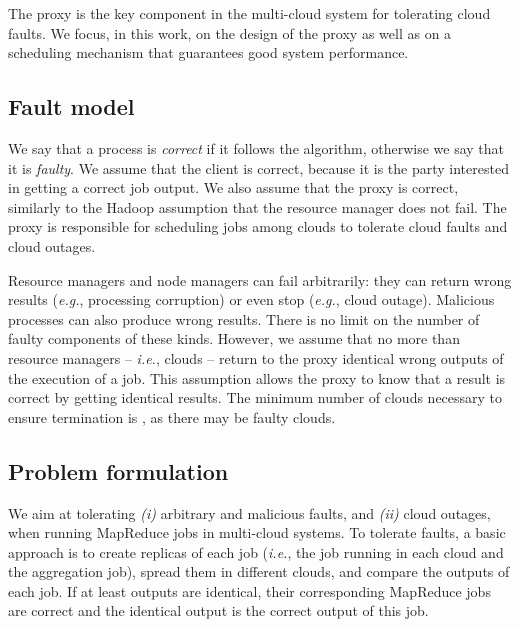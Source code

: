 \documentclass[10pt, conference, compsocconf]{IEEEtran}
\begin{document}
The proxy is the key component in the multi-cloud system for tolerating cloud faults. We focus, in this work, on the design of the proxy as well as on a scheduling mechanism that guarantees good system performance.

\subsection{Fault model}
\label{sec:problem:faultmodel}

We say that a process is \emph{correct} if it follows the algorithm, otherwise we say that it is \emph{faulty}.
We assume that the client is correct, because it is the party interested in getting a correct job output.
We also assume that the proxy is correct, similarly to the Hadoop assumption that the resource manager does not fail.
The proxy is responsible for scheduling jobs among clouds to tolerate cloud faults and cloud outages.

Resource managers and node managers can fail arbitrarily: they can return wrong results (\textit{e.g.}, processing corruption) or even stop (\textit{e.g.}, cloud outage).
Malicious processes can also produce wrong results.
There is no limit on the number of faulty components of these kinds.
However, we assume that no more than  resource managers -- \textit{i.e.},  clouds -- return to the proxy identical wrong outputs of the execution of a job.
This assumption allows the proxy to know that a result is correct by getting  identical results.
The minimum number of clouds necessary to ensure termination is , as there may be  faulty clouds.

\subsection{Problem formulation}
\label{sec:problem:statement:problem:definition}

We aim at tolerating \textit{(i)} arbitrary and malicious faults, and \textit{(ii)} cloud outages, when running MapReduce jobs in multi-cloud systems. To tolerate  faults, a basic approach is to create  replicas of each job (\textit{i.e.}, the job running in each cloud and the aggregation job), spread them in  different clouds, and compare the  outputs of each job. If at least  outputs are identical, their corresponding MapReduce jobs are correct and the identical output is the correct output of this job.
\end{document}
